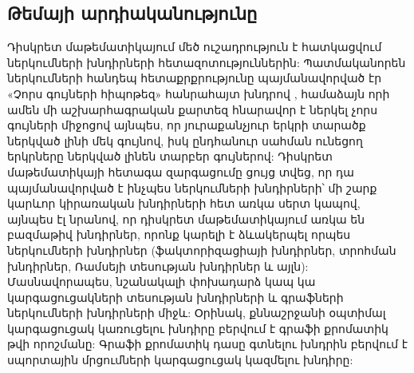 \subsection*{Թեմայի արդիականությունը} 

Դիսկրետ մաթեմատիկայում մեծ ուշադրություն է հատկացվում ներկումների խնդիրների հետազոտություններին: Պատմականորեն ներկումների հանդեպ հետաքրքրությունը պայմանավորված էր «Չորս գույների հիպոթեզ» հանրահայտ խնդրով \cite{AppelHaken1,AppelHaken2}, համաձայն որի ամեն մի աշխարհագրական քարտեզ հնարավոր է ներկել չորս գույների միջոցով այնպես, որ յուրաքանչյուր երկրի տարածք ներկված լինի մեկ գույնով, իսկ ընդհանուր սահման ունեցող երկրները ներկված լինեն տարբեր գույներով: Դիսկրետ մաթեմատիկայի հետագա զարգացումը ցույց տվեց, որ դա պայմանավորված է ինչպես ներկումների խնդիրների՝ մի շարք կարևոր կիրառական խնդիրների հետ առկա սերտ կապով, այնպես էլ նրանով, որ դիսկրետ մաթեմատիկայում առկա են բազմաթիվ խնդիրներ, որոնք կարելի է ձևակերպել որպես ներկումների խնդիրներ (ֆակտորիզացիայի խնդիրներ, տրոհման խնդիրներ, Ռամսեյի տեսության խնդիրներ և այլն): Մասնավորապես, նշանակալի փոխադարձ կապ կա կարգացուցակների տեսության խնդիրների և գրաֆների ներկումների խնդիրների միջև: Օրինակ, քննաշրջանի օպտիմալ կարգացուցակ կառուցելու խնդիրը բերվում է գրաֆի քրոմատիկ թվի որոշմանը: Գրաֆի քրոմատիկ դասը գտնելու խնդրին բերվում է սպորտային մրցումների կարգացուցակ կազմելու խնդիրը:

